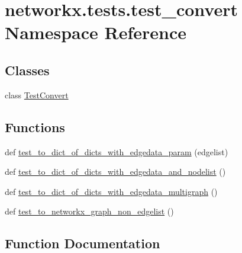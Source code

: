 \hypertarget{namespacenetworkx_1_1tests_1_1test__convert}{}\section{networkx.\+tests.\+test\+\_\+convert Namespace Reference}
\label{namespacenetworkx_1_1tests_1_1test__convert}
\subsection*{Classes}
\begin{DoxyCompactItemize}
\item 
class \hyperlink{classnetworkx_1_1tests_1_1test__convert_1_1TestConvert}{Test\+Convert}
\end{DoxyCompactItemize}
\subsection*{Functions}
\begin{DoxyCompactItemize}
\item 
def \hyperlink{namespacenetworkx_1_1tests_1_1test__convert_aa9acc1e297ead1384eeb57f0ff7f3112}{test\+\_\+to\+\_\+dict\+\_\+of\+\_\+dicts\+\_\+with\+\_\+edgedata\+\_\+param} (edgelist)
\item 
def \hyperlink{namespacenetworkx_1_1tests_1_1test__convert_a0095e662a76511f81eda5624c1b1427e}{test\+\_\+to\+\_\+dict\+\_\+of\+\_\+dicts\+\_\+with\+\_\+edgedata\+\_\+and\+\_\+nodelist} ()
\item 
def \hyperlink{namespacenetworkx_1_1tests_1_1test__convert_a01bab058e05ea0073b90e74c0e85d763}{test\+\_\+to\+\_\+dict\+\_\+of\+\_\+dicts\+\_\+with\+\_\+edgedata\+\_\+multigraph} ()
\item 
def \hyperlink{namespacenetworkx_1_1tests_1_1test__convert_a5056b4e80c262016d3314bb2cc9dc854}{test\+\_\+to\+\_\+networkx\+\_\+graph\+\_\+non\+\_\+edgelist} ()
\end{DoxyCompactItemize}


\subsection{Function Documentation}
\mbox{\label{namespacenetworkx_1_1tests_1_1test__convert_a0095e662a76511f81eda5624c1b1427e}} 
